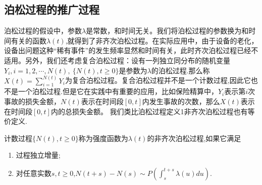 \documentclass[lang=cn,10pt]{elegantbook}
\begin{document}
	\subsection{泊松过程的推广过程}
	泊松过程的假设中，参数\(\lambda\)是常数，和时间无关。我们将泊松过程的参数换为和时间有关的函数\(\lambda(t)\),就得到了非齐次泊松过程。在实际应用中，由于设备的老化，设备出问题这种“稀有事件”的发生频率显然和时间有关，此时齐次泊松过程已经不适用。另外，我们还考虑复合泊松过程：设有一列独立同分布的随机变量\(Y_i,i=1,2,\cdots,N(t),\ \{N(t),t\ge 0\}\)是参数为\(\lambda\)的泊松过程.那么称\(X(t)=\sum_{i=1}^{N(t)}Y_i\)为复合泊松过程。复合泊松过程并不是一个计数过程,因此它也不是一个泊松过程.但是它在实践中有重要的应用，比如保险精算中，\(Y_i\)表示第\(i\)次事故的损失金额，\(N(t)\)表示在时间段\([0,t]\)内发生事故的次数，那么\(X(t)\)表示在时间段\([0,t]\)内的总损失金额。
	我们类比泊松过程定义1非齐次泊松过程也有等价定义.
	\begin{definition}[非齐次泊松过程1]
		计数过程\(\{N(t),t\ge0\}\)称为强度函数为\(\lambda(t)\)的非齐次泊松过程,如果它满足
		\begin{enumerate}
			\item 过程独立增量;
			\item 对任意实数\(s,t\ge 0\),\(N(t+s)-N(s)\sim P\left(\int_{s}^{t+s}\lambda(u)du\right)\).
		\end{enumerate}
	\end{definition}
\end{document}
